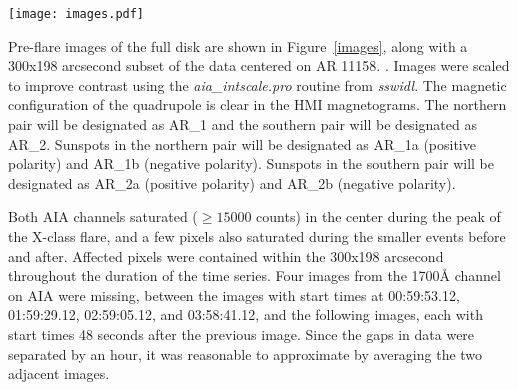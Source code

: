 \begin{figure*}[htb!]\centering
    \texttt{[image: images.pdf]}
    \caption{
        Images of active region 11158 in AIA 1600\AA{} (left panels),
        AIA 1700\AA{} (middle panels), and HMI LOS magnetogram (right panels),
        scaled to $\pm300$ Gauss.
        The top panels show the full disk,
        and the bottom panels show the region used for analysis in this study.
        \label{images}}
\end{figure*}
Pre-flare images of the full disk are shown in \myfig Figure~\ref{images},
along with a 300x198 arcsecond subset of the data centered on AR 11158.
\citep{McAteer2003,McAteer2004}.
Images were scaled to improve contrast using the
\textit{aia\_intscale.pro} routine from \textit{sswidl}.
The magnetic configuration of the quadrupole is clear in the HMI magnetograms.
The northern pair will be designated as AR\_1
and the southern pair will be designated as AR\_2.
Sunspots in the northern pair will be designated as AR\_1a (positive polarity)
and AR\_1b (negative polarity).
Sunspots in the southern pair will be designated as AR\_2a (positive polarity)
and AR\_2b (negative polarity).

Both AIA channels saturated ($\geq\!15000$ counts) in the center
during the peak of the X-class flare, and a few pixels also saturated
during the smaller events before and after.
Affected pixels were  contained within the
300x198 arcsecond 
throughout the duration of the time series.
Four images from the 1700\AA{} channel on AIA were missing, between
the images with start times at
00:59:53.12,
01:59:29.12,
02:59:05.12, and
03:58:41.12, and the following images, each with start times
48 seconds after the previous image.
Since the gaps in data were separated by an hour,
it was reasonable to approximate 
by averaging the two adjacent images.
